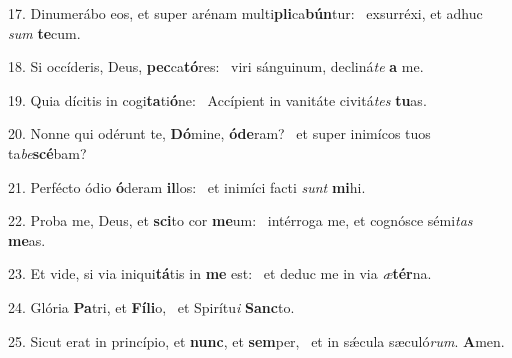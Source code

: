 17. Dinumerábo eos, et super arénam multi\textbf{pli}ca\textbf{bún}tur: \ast\  exsurréxi, et adhuc \textit{sum} \textbf{te}cum.\

18. Si occíderis, Deus, \textbf{pec}ca\textbf{tó}res: \ast\  viri sánguinum, decliná\textit{te} \textbf{a} me.\

19. Quia dícitis in cogi\textbf{ta}ti\textbf{ó}ne: \ast\  Accípient in vanitáte civitá\textit{tes} \textbf{tu}as.\

20. Nonne qui odérunt te, \textbf{Dó}mine, \textbf{ó}\textbf{de}ram? \ast\  et super inimícos tuos ta\textit{be}\textbf{scé}bam?\

21. Perfécto ódio \textbf{ó}deram \textbf{il}los: \ast\  et inimíci facti \textit{sunt} \textbf{mi}hi.\

22. Proba me, Deus, et \textbf{sci}to cor \textbf{me}um: \ast\  intérroga me, et cognósce sémi\textit{tas} \textbf{me}as.\

23. Et vide, si via iniqui\textbf{tá}tis in \textbf{me} est: \ast\  et deduc me in via \textit{æ}\textbf{tér}na.\

24. Glória \textbf{Pa}tri, et \textbf{Fí}\textbf{li}o, \ast\  et Spirítu\textit{i} \textbf{Sanc}to.\

25. Sicut erat in princípio, et \textbf{nunc}, et \textbf{sem}per, \ast\  et in sǽcula sæculó\textit{rum}. \textbf{A}men.\

